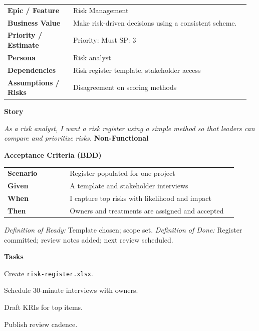 \documentclass[11pt,letterpaper]{article}
\makeatletter
\newenvironment{kvtable}{%
  \begin{tabular}{@{}>{\bfseries\arraybackslash}p{0.26\linewidth} p{0.70\linewidth}@{}}
}{\end{tabular}}
\newenvironment{bdd}{%
  \begin{tabular}{@{}>{\bfseries\arraybackslash}p{0.26\linewidth} p{0.70\linewidth}@{}}
}{\end{tabular}}
\newcommand{\DoRDoD}[2]{%
  \vspace{0.35em}
  {\footnotesize\color{Muted}%
    \textit{Definition of Ready:} #1 \; \textbullet\;
    \textit{Definition of Done:} #2%
  }%
}
\newenvironment{storycard}[2]{%
  \begin{tcolorbox}[cloudcard, title={#1 --- #2}]%
}{\end{tcolorbox}}
\newcommand{\sectionlabel}[1]{\vspace{0.35em}\textbf{#1}\par}
\makeatother
\begin{document}
\begin{storycard}{CCS-6}{Ch. 6 — Risk \& Trust Assessment Schemes}
\begin{kvtable}
Epic / Feature & Risk Management\\
Business Value & Make risk-driven decisions using a consistent scheme.\\
Priority / Estimate & Priority: Must \quad SP: 3\\
Persona & Risk analyst\\
Dependencies & Risk register template, stakeholder access\\
Assumptions / Risks & Disagreement on scoring methods\\
\end{kvtable}
\sectionlabel{Story}
\textit{As a risk analyst, I want a risk register using a simple method so that leaders can compare and prioritize risks.}
\sectionlabel{Non-Functional}\;
\sectionlabel{Acceptance Criteria (BDD)}
\begin{bdd}
Scenario & Register populated for one project\\
Given & A template and stakeholder interviews\\
When & I capture top risks with likelihood and impact\\
Then & Owners and treatments are assigned and accepted\\
\end{bdd}
\DoRDoD{Template chosen; scope set.}{Register committed; review notes added; next review scheduled.}
\sectionlabel{Tasks}
\begin{checklist}
\item Create \texttt{risk-register.xlsx}.
\item Schedule 30-minute interviews with owners.
\item Draft KRIs for top items.
\item Publish review cadence.
\end{checklist}
\end{storycard}
\end{document}
